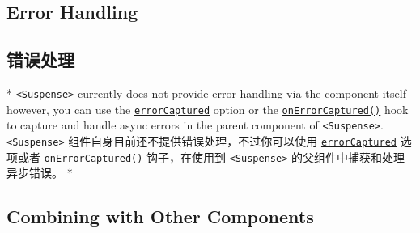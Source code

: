 \begin{paracol}{2}
\subsection{Error Handling}
\switchcolumn
\subsection{错误处理}
\switchcolumn[0]*%
\texttt{\textless{}Suspense\textgreater{}} currently does not provide
error handling via the component itself - however, you can use the
\href{https://vuejs.org/api/options-lifecycle.html\#errorcaptured}{\texttt{errorCaptured}}
option or the
\href{https://vuejs.org/api/composition-api-lifecycle.html\#onerrorcaptured}{\texttt{onErrorCaptured()}}
hook to capture and handle async errors in the parent component of
\texttt{\textless{}Suspense\textgreater{}}.
\switchcolumn
\texttt{\textless{}Suspense\textgreater{}}
组件自身目前还不提供错误处理，不过你可以使用
\href{https://cn.vuejs.org/api/options-lifecycle.html\#errorcaptured}{\texttt{errorCaptured}}
选项或者
\href{https://cn.vuejs.org/api/composition-api-lifecycle.html\#onerrorcaptured}{\texttt{onErrorCaptured()}}
钩子，在使用到 \texttt{\textless{}Suspense\textgreater{}}
的父组件中捕获和处理异步错误。
\switchcolumn[0]*%
\subsection{Combining with Other Components}
\switchcolumn

\end{paracol}
